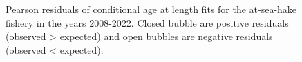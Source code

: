 \documentclass[
]{scrartcl}
\begin{document}
\begin{figure}[H]


\caption{\label{fig-peasrson-resids-age-ashop1}Pearson residuals of
conditional age at length fits for the at-sea-hake fishery in the years
2008-2022. Closed bubble are positive residuals (observed \textgreater{}
expected) and open bubbles are negative residuals (observed \textless{}
expected).}

\end{figure}%
\end{document}
